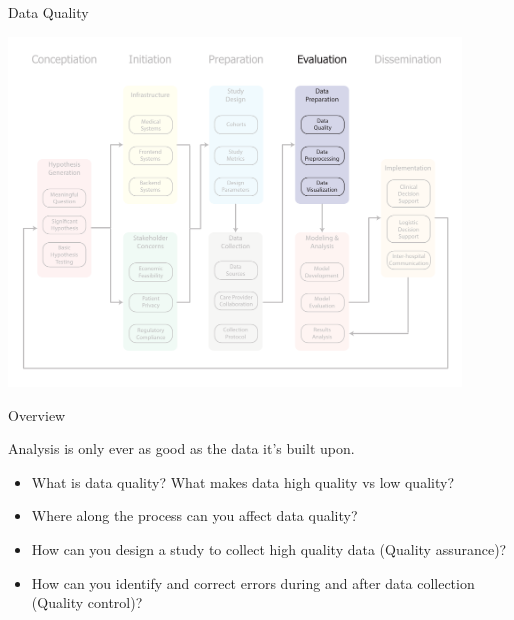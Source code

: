 \documentclass[10pt, xcolor=table]{beamer}
\begin{document}
\begin{frame}{Data Quality}
	\begin{center}
		\includegraphics[width=0.9\textwidth]{images/informatics_pipeline_data_quality.pdf}	
	\end{center}
\end{frame}






\begin{frame}{Overview}
	\begin{center}
		Analysis is only ever as good as the data it's built upon.
	\end{center}
	\begin{itemize}[<+(1)->]
		\item What is data quality? What makes data high quality vs low quality?
		\item Where along the process can you affect data quality?
		\item How can you design a study to collect high quality data (Quality assurance)?
		\item How can you identify and correct errors during and after data collection (Quality control)?
	\end{itemize}
\end{frame}
\end{document}
